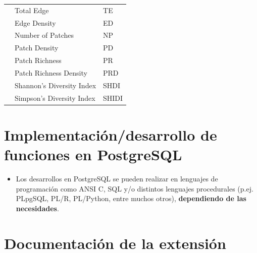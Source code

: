 \begin{table}[]
\begin{tabular}{lll}
                           & Total Edge                           & TE                   \\
                           & Edge Density                         & ED                   \\
                           & Number of Patches                    & NP                   \\
                           & Patch Density                        & PD                   \\
                           & Patch Richness                       & PR                   \\
                           & Patch Richness Density               & PRD                  \\
                           & Shannon's Diversity Index            & SHDI                 \\
                           & Simpson's Diversity Index            & SHIDI                \\ \hline
\end{tabular}
\end{table}


\section{Implementación/desarrollo de funciones en PostgreSQL}

\begin{graybox}
\begin{itemize}
\item Los desarrollos en PostgreSQL se pueden realizar en lenguajes de programación como ANSI C, SQL y/o distintos lenguajes procedurales (p.ej. PLpgSQL, PL/R, PL/Python, entre muchos otros), \textbf{dependiendo de las necesidades}.
\end{itemize}
\end{graybox}















\section{Documentación de la extensión}

